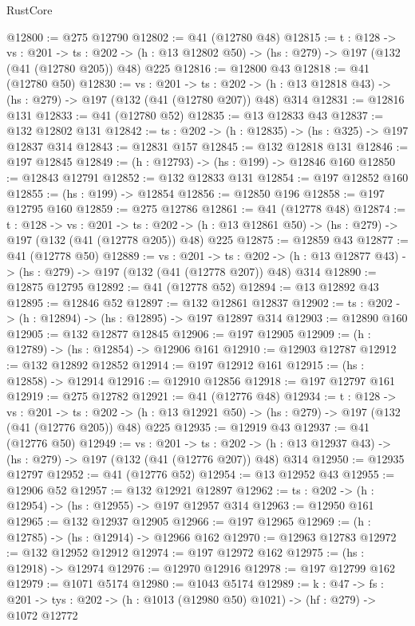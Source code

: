 \begin{lexlean}{RustCore}
\begin{coremodule}
@12800 := @275 @12790
@12802 := @41 (@12780 @48)
@12815 := {t : @128} ->
  {vs : @201} ->
  {ts : @202} -> (h : @13 @12802 @50) -> (hs : @279) -> @197 (@132 (@41 (@12780 @205)) @48) @225
@12816 := @12800 @43
@12818 := @41 (@12780 @50)
@12830 := {vs : @201} ->
  {ts : @202} -> (h : @13 @12818 @43) -> (hs : @279) -> @197 (@132 (@41 (@12780 @207)) @48) @314
@12831 := @12816 @131
@12833 := @41 (@12780 @52)
@12835 := @13 @12833 @43
@12837 := @132 @12802 @131
@12842 := {ts : @202} -> (h : @12835) -> (hs : @325) -> @197 @12837 @314
@12843 := @12831 @157
@12845 := @132 @12818 @131
@12846 := @197 @12845
@12849 := (h : @12793) -> (hs : @199) -> @12846 @160
@12850 := @12843 @12791
@12852 := @132 @12833 @131
@12854 := @197 @12852 @160
@12855 := (hs : @199) -> @12854
@12856 := @12850 @196
@12858 := @197 @12795 @160
@12859 := @275 @12786
@12861 := @41 (@12778 @48)
@12874 := {t : @128} ->
  {vs : @201} ->
  {ts : @202} -> (h : @13 @12861 @50) -> (hs : @279) -> @197 (@132 (@41 (@12778 @205)) @48) @225
@12875 := @12859 @43
@12877 := @41 (@12778 @50)
@12889 := {vs : @201} ->
  {ts : @202} -> (h : @13 @12877 @43) -> (hs : @279) -> @197 (@132 (@41 (@12778 @207)) @48) @314
@12890 := @12875 @12795
@12892 := @41 (@12778 @52)
@12894 := @13 @12892 @43
@12895 := @12846 @52
@12897 := @132 @12861 @12837
@12902 := {ts : @202} -> (h : @12894) -> (hs : @12895) -> @197 @12897 @314
@12903 := @12890 @160
@12905 := @132 @12877 @12845
@12906 := @197 @12905
@12909 := (h : @12789) -> (hs : @12854) -> @12906 @161
@12910 := @12903 @12787
@12912 := @132 @12892 @12852
@12914 := @197 @12912 @161
@12915 := (hs : @12858) -> @12914
@12916 := @12910 @12856
@12918 := @197 @12797 @161
@12919 := @275 @12782
@12921 := @41 (@12776 @48)
@12934 := {t : @128} ->
  {vs : @201} ->
  {ts : @202} -> (h : @13 @12921 @50) -> (hs : @279) -> @197 (@132 (@41 (@12776 @205)) @48) @225
@12935 := @12919 @43
@12937 := @41 (@12776 @50)
@12949 := {vs : @201} ->
  {ts : @202} -> (h : @13 @12937 @43) -> (hs : @279) -> @197 (@132 (@41 (@12776 @207)) @48) @314
@12950 := @12935 @12797
@12952 := @41 (@12776 @52)
@12954 := @13 @12952 @43
@12955 := @12906 @52
@12957 := @132 @12921 @12897
@12962 := {ts : @202} -> (h : @12954) -> (hs : @12955) -> @197 @12957 @314
@12963 := @12950 @161
@12965 := @132 @12937 @12905
@12966 := @197 @12965
@12969 := (h : @12785) -> (hs : @12914) -> @12966 @162
@12970 := @12963 @12783
@12972 := @132 @12952 @12912
@12974 := @197 @12972 @162
@12975 := (hs : @12918) -> @12974
@12976 := @12970 @12916
@12978 := @197 @12799 @162
@12979 := @1071 @5174
@12980 := @1043 @5174
@12989 := {k : @47} ->
  {fs : @201} -> {tys : @202} -> (h : @1013 (@12980 @50) @1021) -> (hf : @279) -> @1072 @12772

\end{coremodule}
\end{lexlean}

